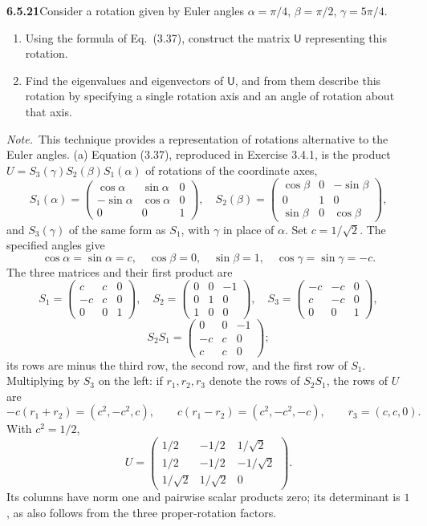 \par\bigskip
\noindent\textbf{6.5.21}\quad Consider a rotation given by Euler angles
$\alpha=\pi/4$, $\beta=\pi/2$, $\gamma=5\pi/4$.
\begin{enumerate}
\item[(a)] Using the formula of Eq.~(3.37), construct the matrix $\mathsf{U}$
  representing this rotation.
\item[(b)] Find the eigenvalues and eigenvectors of $\mathsf{U}$, and from
  them describe this rotation by specifying a single rotation axis and an
  angle of rotation about that axis.
\end{enumerate}
\emph{Note.}~This technique provides a representation of rotations alternative
to the Euler angles.
\solution
(a) Equation (3.37), reproduced in Exercise 3.4.1, is the product
$U=S_3(\gamma)S_2(\beta)S_1(\alpha)$ of rotations of the coordinate axes,
\[
S_1(\alpha)=\begin{pmatrix}\cos\alpha&\sin\alpha&0\\
-\sin\alpha&\cos\alpha&0\\0&0&1\end{pmatrix},\quad
S_2(\beta)=\begin{pmatrix}\cos\beta&0&-\sin\beta\\
0&1&0\\\sin\beta&0&\cos\beta\end{pmatrix},
\]
and $S_3(\gamma)$ of the same form as $S_1$, with $\gamma$ in place of
$\alpha$. Set $c=1/\sqrt2$. The specified angles give
\[
\cos\alpha=\sin\alpha=c,\quad
\cos\beta=0,\quad\sin\beta=1,\quad
\cos\gamma=\sin\gamma=-c.
\]
The three matrices and their first product are
\[
S_1=\begin{pmatrix}c&c&0\\-c&c&0\\0&0&1\end{pmatrix},\quad
S_2=\begin{pmatrix}0&0&-1\\0&1&0\\1&0&0\end{pmatrix},\quad
S_3=\begin{pmatrix}-c&-c&0\\c&-c&0\\0&0&1\end{pmatrix},
\]
\[
S_2S_1=\begin{pmatrix}0&0&-1\\-c&c&0\\c&c&0\end{pmatrix};
\]
its rows are minus the third row, the second row, and the first row
of $S_1$. Multiplying by $S_3$ on the left: if $r_1,r_2,r_3$ denote the
rows of $S_2S_1$, the rows of $U$ are
\[
-c(r_1+r_2)=(c^2,-c^2,c),\qquad
c(r_1-r_2)=(c^2,-c^2,-c),\qquad
r_3=(c,c,0).
\]
With $c^2=1/2$,
\[
\boxed{U=\begin{pmatrix}
1/2&-1/2&1/\sqrt2\\
1/2&-1/2&-1/\sqrt2\\
1/\sqrt2&1/\sqrt2&0
\end{pmatrix}.}
\]
Its columns have norm one and pairwise scalar products zero; its
determinant is $1$, as also follows from the three proper-rotation
factors.

